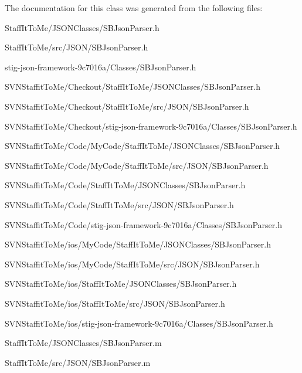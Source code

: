 \-The documentation for this class was generated from the following files\-:\begin{DoxyCompactItemize}
\item 
\-Staff\-It\-To\-Me/\-J\-S\-O\-N\-Classes/\-S\-B\-Json\-Parser.\-h\item 
\-Staff\-It\-To\-Me/src/\-J\-S\-O\-N/\-S\-B\-Json\-Parser.\-h\item 
stig-\/json-\/framework-\/9c7016a/\-Classes/\-S\-B\-Json\-Parser.\-h\item 
\-S\-V\-N\-Staffit\-To\-Me/\-Checkout/\-Staff\-It\-To\-Me/\-J\-S\-O\-N\-Classes/\-S\-B\-Json\-Parser.\-h\item 
\-S\-V\-N\-Staffit\-To\-Me/\-Checkout/\-Staff\-It\-To\-Me/src/\-J\-S\-O\-N/\-S\-B\-Json\-Parser.\-h\item 
\-S\-V\-N\-Staffit\-To\-Me/\-Checkout/stig-\/json-\/framework-\/9c7016a/\-Classes/\-S\-B\-Json\-Parser.\-h\item 
\-S\-V\-N\-Staffit\-To\-Me/\-Code/\-My\-Code/\-Staff\-It\-To\-Me/\-J\-S\-O\-N\-Classes/\-S\-B\-Json\-Parser.\-h\item 
\-S\-V\-N\-Staffit\-To\-Me/\-Code/\-My\-Code/\-Staff\-It\-To\-Me/src/\-J\-S\-O\-N/\-S\-B\-Json\-Parser.\-h\item 
\-S\-V\-N\-Staffit\-To\-Me/\-Code/\-Staff\-It\-To\-Me/\-J\-S\-O\-N\-Classes/\-S\-B\-Json\-Parser.\-h\item 
\-S\-V\-N\-Staffit\-To\-Me/\-Code/\-Staff\-It\-To\-Me/src/\-J\-S\-O\-N/\-S\-B\-Json\-Parser.\-h\item 
\-S\-V\-N\-Staffit\-To\-Me/\-Code/stig-\/json-\/framework-\/9c7016a/\-Classes/\-S\-B\-Json\-Parser.\-h\item 
\-S\-V\-N\-Staffit\-To\-Me/ios/\-My\-Code/\-Staff\-It\-To\-Me/\-J\-S\-O\-N\-Classes/\-S\-B\-Json\-Parser.\-h\item 
\-S\-V\-N\-Staffit\-To\-Me/ios/\-My\-Code/\-Staff\-It\-To\-Me/src/\-J\-S\-O\-N/\-S\-B\-Json\-Parser.\-h\item 
\-S\-V\-N\-Staffit\-To\-Me/ios/\-Staff\-It\-To\-Me/\-J\-S\-O\-N\-Classes/\-S\-B\-Json\-Parser.\-h\item 
\-S\-V\-N\-Staffit\-To\-Me/ios/\-Staff\-It\-To\-Me/src/\-J\-S\-O\-N/\-S\-B\-Json\-Parser.\-h\item 
\-S\-V\-N\-Staffit\-To\-Me/ios/stig-\/json-\/framework-\/9c7016a/\-Classes/\-S\-B\-Json\-Parser.\-h\item 
\-Staff\-It\-To\-Me/\-J\-S\-O\-N\-Classes/\-S\-B\-Json\-Parser.\-m\item 
\-Staff\-It\-To\-Me/src/\-J\-S\-O\-N/\-S\-B\-Json\-Parser.\-m\item 

\end{DoxyCompactItemize}
